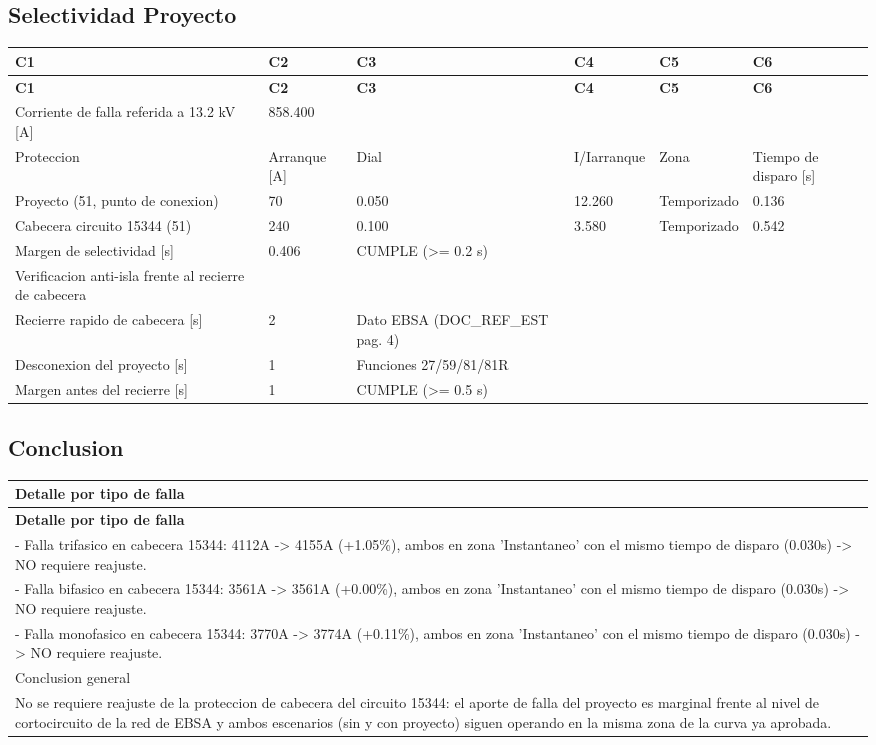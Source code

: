 \documentclass[11pt,a4paper]{article}
\begin{document}
\subsection{Selectividad Proyecto}

\small
\begin{longtable}{llllll}
\toprule
\textbf{C1} & \textbf{C2} & \textbf{C3} & \textbf{C4} & \textbf{C5} & \textbf{C6} \\
\midrule
\endfirsthead
\toprule
\textbf{C1} & \textbf{C2} & \textbf{C3} & \textbf{C4} & \textbf{C5} & \textbf{C6} \\
\midrule
\endhead
\bottomrule
\endfoot
Corriente de falla referida a 13.2 kV [A] & 858.400 &  &  &  &  \\
Proteccion & Arranque [A] & Dial & I/Iarranque & Zona & Tiempo de disparo [s] \\
Proyecto (51, punto de conexion) & 70 & 0.050 & 12.260 & Temporizado & 0.136 \\
Cabecera circuito 15344 (51) & 240 & 0.100 & 3.580 & Temporizado & 0.542 \\
Margen de selectividad [s] & 0.406 & CUMPLE (>= 0.2 s) &  &  &  \\
Verificacion anti-isla frente al recierre de cabecera &  &  &  &  &  \\
Recierre rapido de cabecera [s] & 2 & Dato EBSA (DOC\_REF\_EST pag. 4) &  &  &  \\
Desconexion del proyecto [s] & 1 & Funciones 27/59/81/81R &  &  &  \\
Margen antes del recierre [s] & 1 & CUMPLE (>= 0.5 s) &  &  &  \\
\end{longtable}

\subsection{Conclusion}

\small
\begin{longtable}{l}
\toprule
\textbf{Detalle por tipo de falla} \\
\midrule
\endfirsthead
\toprule
\textbf{Detalle por tipo de falla} \\
\midrule
\endhead
\bottomrule
\endfoot
- Falla trifasico en cabecera 15344: 4112A -> 4155A (+1.05\%), ambos en zona 'Instantaneo' con el mismo tiempo de disparo (0.030s) -> NO requiere reajuste. \\
- Falla bifasico en cabecera 15344: 3561A -> 3561A (+0.00\%), ambos en zona 'Instantaneo' con el mismo tiempo de disparo (0.030s) -> NO requiere reajuste. \\
- Falla monofasico en cabecera 15344: 3770A -> 3774A (+0.11\%), ambos en zona 'Instantaneo' con el mismo tiempo de disparo (0.030s) -> NO requiere reajuste. \\
Conclusion general \\
No se requiere reajuste de la proteccion de cabecera del circuito 15344: el aporte de falla del proyecto es marginal frente al nivel de cortocircuito de la red de EBSA y ambos escenarios (sin y con proyecto) siguen operando en la misma zona de la curva ya aprobada. \\
\end{longtable}
\end{document}
